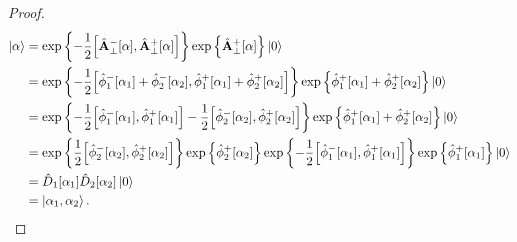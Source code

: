 \qmwqkgcoherentstate
\begin{proof}
	\begin{equation*}
		\begin{split}
			\ket{\vb{\alpha}}
			&=
			\exp\left\{
				-
				\frac{1}{2}
				\comm{\hat{\vb{A}}_\perp^-[\vb{\alpha}]}{\hat{\vb{A}}_\perp^+[\vb{\alpha}]}
			\right\}
			\exp\left\{
				\hat{\vb{A}}_\perp^+[\vb{\alpha}]
			\right\}
			\ket{0}
			\\
			&=
			\exp\left\{
				-
				\frac{1}{2}
				\comm{
					\hat\phi_1^-[\alpha_1]
					+
					\hat\phi_2^-[\alpha_2]
				}{
					\hat\phi_1^+[\alpha_1]
					+
					\hat\phi_2^+[\alpha_2]
				}
			\right\}
			\exp\left\{
				\hat\phi_1^+[\alpha_1]
				+
				\hat\phi_2^+[\alpha_2]
			\right\}
			\ket{0}
			\\
			&=
			\exp\left\{
				-
				\frac{1}{2}
				\comm{\hat\phi_1^-[\alpha_1]}{\hat\phi_1^+[\alpha_1]}
				-
				\frac{1}{2}
				\comm{\hat\phi_2^-[\alpha_2]}{\hat\phi_2^+[\alpha_2]}
			\right\}
			\exp\left\{
				\hat\phi_1^+[\alpha_1]
				+
				\hat\phi_2^+[\alpha_2]
			\right\}
			\ket{0}
			\\
			&=
			\exp\left\{
				\frac{1}{2}
				\comm{\hat\phi_2^-[\alpha_2]}{\hat\phi_2^+[\alpha_2]}
			\right\}
			\exp\left\{
				\hat\phi_2^+[\alpha_2]
			\right\}
			\exp\left\{
				-
				\frac{1}{2}
				\comm{\hat\phi_1^-[\alpha_1]}{\hat\phi_1^+[\alpha_1]}
			\right\}
			\exp\left\{
				\hat\phi_1^+[\alpha_1]
			\right\}
			\ket{0}
			\\
			&=
			\hat{D}_1[\alpha_1]
			\hat{D}_2[\alpha_2]
			\ket{0}
			\\
			&=
			\ket{\alpha_1,\alpha_2}
			.
		\end{split}
	\end{equation*}
\end{proof}